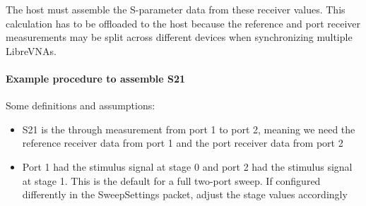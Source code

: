 \documentclass[a4paper,11pt]{article}
\begin{document}
The host must assemble the S-parameter data from these receiver values. This calculation has to be offloaded to the host because the reference and port receiver measurements may be split across different devices when synchronizing multiple LibreVNAs.

\paragraph{Example procedure to assemble S21}
Some definitions and assumptions:
\begin{itemize}
\item S21 is the through measurement from port 1 to port 2, meaning we need the reference receiver data from port 1 and the port receiver data from port 2
\item Port 1 had the stimulus signal at stage 0 and port 2 had the stimulus signal at stage 1. This is the default for a full two-port sweep. If configured differently in the SweepSettings packet, adjust the stage values accordingly
\end{itemize}
\end{document}
